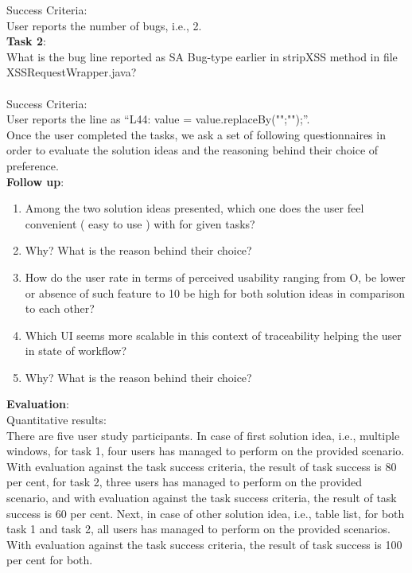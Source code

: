 Success Criteria: \\

User reports the number of bugs, i.e., 2. \\

\textbf{Task 2}: \\

What is the bug line reported as SA Bug-type earlier in stripXSS method in file XSSRequestWrapper.java? \\ \\

Success Criteria: \\
 
User reports the line as “L44: value = value.replaceBy("";"");”. \\

Once the user completed the tasks, we ask a set of following questionnaires in order to evaluate the solution ideas and the reasoning behind their choice of preference. \\

\textbf{Follow up}: \\

\begin{enumerate}
\item Among the two solution ideas presented, which one does the user feel convenient ( easy to use ) with for given tasks?
\item Why? What is the reason behind their choice?
\item How do the user rate in terms of perceived usability ranging from O, be lower or absence of such feature to 10 be high for both solution ideas in comparison to each other?
\item Which UI seems more scalable in this context of traceability helping the user in state of workflow?
\item Why? What is the reason behind their choice?
\end{enumerate}

\textbf{Evaluation}: \\

Quantitative results: \\

There are five user study participants. In case of first solution idea, i.e., multiple windows, for task 1, four users has managed to perform on the provided scenario. With evaluation against the task success criteria, the result of task success is 80 per cent, for task 2, three users has managed to perform on the provided scenario, and with evaluation against the task success criteria, the result of task success is 60 per cent. Next, in case of other solution idea, i.e., table list, for both task 1 and task 2, all users has managed to perform on the provided scenarios. With evaluation against the task success criteria, the result of task success is 100 per cent for both. \\

